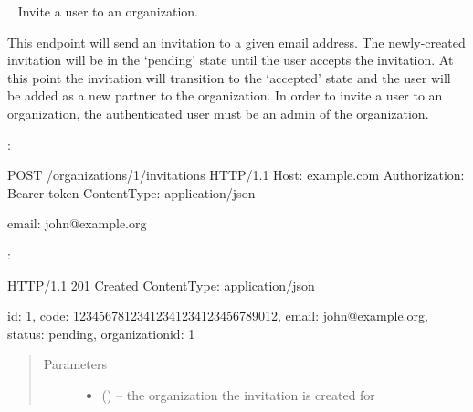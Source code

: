\documentclass[letterpaper,10pt,english]{sphinxmanual}
\begin{document}
\begin{fulllineitems}
\label{\detokenize{resources/organization:post--organizations-(organization_id)-invitations}}~
Invite a user to an organization.

This endpoint will send an invitation to a given email address. The
newly-created invitation will be in the `pending' state until the user
accepts the invitation. At this point the invitation will transition
to the `accepted' state and the user will be added as a new partner to
the organization. In order to invite a user to an organization, the
authenticated user must be an admin of the organization.

:

\begin{sphinxVerbatim}[commandchars=\\\{\}]
POST /organizations/1/invitations HTTP/1.1
Host: example.com
Authorization: Bearer \PYGZlt{}token\PYGZgt{}
Content\PYGZhy{}Type: application/json

\PYGZob{}
    \PYGZsq{}email\PYGZsq{}: \PYGZsq{}john@example.org\PYGZsq{}
\PYGZcb{}
\end{sphinxVerbatim}

:

\begin{sphinxVerbatim}[commandchars=\\\{\}]
HTTP/1.1 201 Created
Content\PYGZhy{}Type: application/json

\PYGZob{}
    \PYGZsq{}id\PYGZsq{}: 1,
    \PYGZsq{}code\PYGZsq{}: \PYGZsq{}12345678\PYGZhy{}1234\PYGZhy{}1234\PYGZhy{}1234\PYGZhy{}123456789012\PYGZsq{},
    \PYGZsq{}email\PYGZsq{}: \PYGZsq{}john@example.org\PYGZsq{},
    \PYGZsq{}status\PYGZsq{}: \PYGZsq{}pending\PYGZsq{},
    \PYGZsq{}organization\PYGZus{}id\PYGZsq{}: 1
\PYGZcb{}
\end{sphinxVerbatim}
\begin{quote}\begin{description}
\item[{Parameters}] \leavevmode\begin{itemize}
\item {} 
 () -- the organization the invitation is created
for

\end{itemize}


\end{description}
\end{quote}
\end{fulllineitems}
\end{document}
